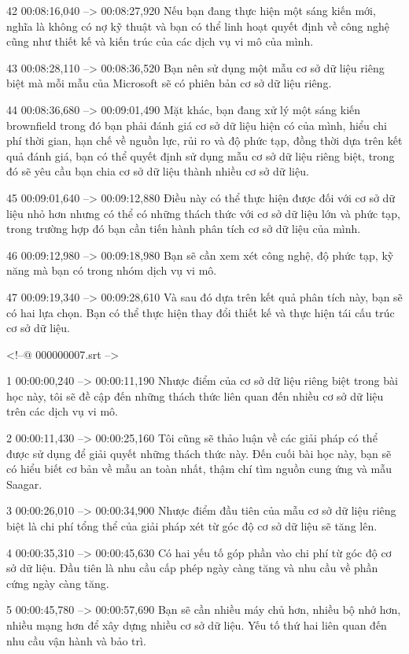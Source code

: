 42
00:08:16,040 --> 00:08:27,920
Nếu bạn đang thực hiện một sáng kiến ​​mới, nghĩa là không có nợ kỹ thuật và bạn có thể linh hoạt quyết định về công nghệ cũng như thiết kế và kiến ​​trúc của các dịch vụ vi mô của mình.

43
00:08:28,110 --> 00:08:36,520
Bạn nên sử dụng một mẫu cơ sở dữ liệu riêng biệt mà mỗi mẫu của Microsoft sẽ có phiên bản cơ sở dữ liệu riêng.

44
00:08:36,680 --> 00:09:01,490
Mặt khác, bạn đang xử lý một sáng kiến ​​brownfield trong đó bạn phải đánh giá cơ sở dữ liệu hiện có của mình, hiểu chi phí thời gian, hạn chế về nguồn lực, rủi ro và độ phức tạp, đồng thời dựa trên kết quả đánh giá, bạn có thể quyết định sử dụng mẫu cơ sở dữ liệu riêng biệt, trong đó  sẽ yêu cầu bạn chia cơ sở dữ liệu thành nhiều cơ sở dữ liệu.

45
00:09:01,640 --> 00:09:12,880
Điều này có thể thực hiện được đối với cơ sở dữ liệu nhỏ hơn nhưng có thể có những thách thức với cơ sở dữ liệu lớn và phức tạp, trong trường hợp đó bạn cần tiến hành phân tích cơ sở dữ liệu của mình.

46
00:09:12,980 --> 00:09:18,980
Bạn sẽ cần xem xét công nghệ, độ phức tạp, kỹ năng mà bạn có trong nhóm dịch vụ vi mô.

47
00:09:19,340 --> 00:09:28,610
Và sau đó dựa trên kết quả phân tích này, bạn sẽ có hai lựa chọn.  Bạn có thể thực hiện thay đổi thiết kế và thực hiện tái cấu trúc cơ sở dữ liệu.

<!--@ 000000007.srt -->

1
00:00:00,240 --> 00:00:11,190
Nhược điểm của cơ sở dữ liệu riêng biệt trong bài học này, tôi sẽ đề cập đến những thách thức liên quan đến nhiều cơ sở dữ liệu trên các dịch vụ vi mô.

2
00:00:11,430 --> 00:00:25,160
Tôi cũng sẽ thảo luận về các giải pháp có thể được sử dụng để giải quyết những thách thức này.  Đến cuối bài học này, bạn sẽ có hiểu biết cơ bản về mẫu an toàn nhất, thậm chí tìm nguồn cung ứng và mẫu Saagar.

3
00:00:26,010 --> 00:00:34,900
Nhược điểm đầu tiên của mẫu cơ sở dữ liệu riêng biệt là chi phí tổng thể của giải pháp xét từ góc độ cơ sở dữ liệu sẽ tăng lên.

4
00:00:35,310 --> 00:00:45,630
Có hai yếu tố góp phần vào chi phí từ góc độ cơ sở dữ liệu.  Đầu tiên là nhu cầu cấp phép ngày càng tăng và nhu cầu về phần cứng ngày càng tăng.

5
00:00:45,780 --> 00:00:57,690
Bạn sẽ cần nhiều máy chủ hơn, nhiều bộ nhớ hơn, nhiều mạng hơn để xây dựng nhiều cơ sở dữ liệu.  Yếu tố thứ hai liên quan đến nhu cầu vận hành và bảo trì.

